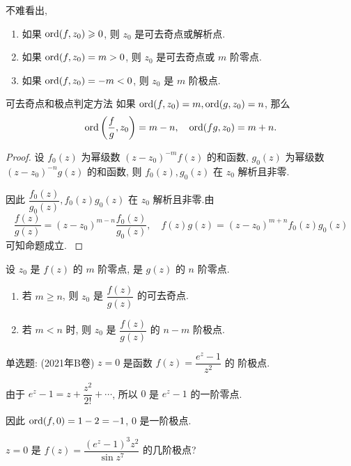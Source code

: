 不难看出,
\begin{enumerate}
	\item 如果 ${\mathrm{ord}}(f,z_0)\geqslant0$, 则 $z_0$ 是可去奇点或解析点.
	\item 如果 ${\mathrm{ord}}(f,z_0)=m>0$, 则 $z_0$ 是可去奇点或 $m$ 阶零点.
	\item 如果 ${\mathrm{ord}}(f,z_0)=-m<0$, 则 $z_0$ 是 $m$ 阶极点.
\end{enumerate}

\begin{second}{可去奇点和极点判定方法}
	如果 ${\mathrm{ord}}(f,z_0)=m,{\mathrm{ord}}(g,z_0)=n$, 那么
	\[{\mathrm{ord}}\left(\frac fg,z_0\right)=m-n,\quad{\mathrm{ord}}(fg,z_0)=m+n.\]
\end{second}

\begin{proof}
		设 $f_0(z)$ 为幂级数 $(z-z_0)^{-m}f(z)$ 的和函数, $g_0(z)$ 为幂级数 $(z-z_0)^{-n}g(z)$ 的和函数,
	{则 $f_0(z),g_0(z)$ 在 $z_0$ 解析且非零.
	}%

	{因此 $\dfrac{f_0(z)}{g_0(z)},f_0(z)g_0(z)$ 在 $z_0$ 解析且非零.由
		\[\frac{f(z)}{g(z)}=(z-z_0)^{m-n}\frac{f_0(z)}{g_0(z)},\quad
		f(z)g(z)=(z-z_0)^{m+n}f_0(z)g_0(z)\]
		可知命题成立.\qedhere
	}
\end{proof}

\begin{corollary}
	设 $z_0$ 是 $f(z)$ 的 $m$ 阶零点, 是 $g(z)$ 的 $n$ 阶零点.
	\begin{enumerate}
		\item 若 $m\ge n$, 则 $z_0$ 是 $\dfrac{f(z)}{g(z)}$ 的可去奇点.
		\item 若 $m<n$ 时, 则 $z_0$ 是 $\dfrac{f(z)}{g(z)}$ 的 $n-m$ 阶极点.
	\end{enumerate}
\end{corollary}

\begin{example}
	单选题: (2021年B卷) $z=0$ 是函数 $f(z)=\dfrac{e^z-1}{z^2}$ 的 阶极点.
\end{example}

\begin{solution}
		由于 $e^z-1=z+\dfrac{z^2}{2!}+\cdots$, 所以 $0$ 是 $e^z-1$ 的一阶零点.

	{因此 ${\mathrm{ord}}(f,0)=1-2=-1$, $0$ 是一阶极点.
	}
\end{solution}

\begin{example}
	$z=0$ 是 $f(z)=\dfrac{(e^z-1)^3z^2}{\sin z^7}$ 的几阶极点?
\end{example}

